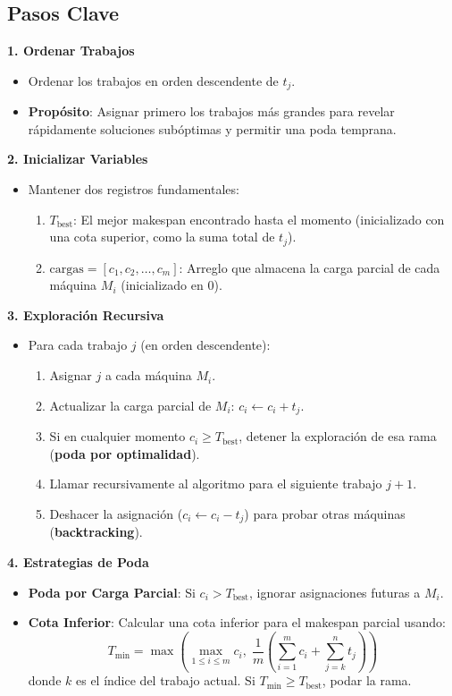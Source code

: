 \documentclass{report}
\begin{document}
		\subsection*{Pasos Clave}

		\textbf{1. Ordenar Trabajos}
		\begin{itemize}
			\item Ordenar los trabajos en orden descendente de \( t_j \). 
			\item \textbf{Propósito}: Asignar primero los trabajos más grandes para revelar rápidamente soluciones subóptimas y permitir una poda temprana.
		\end{itemize}

		\textbf{2. Inicializar Variables}
		\begin{itemize}
			\item Mantener dos registros fundamentales:
			\begin{enumerate}
				\item \( T_{\text{best}} \): El mejor makespan encontrado hasta el momento (inicializado con una cota superior, como la suma total de \( t_j \)).
				\item \( \text{cargas} = [c_1, c_2, \dots, c_m] \): Arreglo que almacena la carga parcial de cada máquina \( M_i \) (inicializado en 0).
			\end{enumerate}
		\end{itemize}

		\textbf{3. Exploración Recursiva}
		\begin{itemize}
			\item Para cada trabajo \( j \) (en orden descendente):
			\begin{enumerate}
				\item Asignar \( j \) a cada máquina \( M_i \).
				\item Actualizar la carga parcial de \( M_i \): \( c_i \leftarrow c_i + t_j \).
				\item Si en cualquier momento \( c_i \geq T_{\text{best}} \), detener la exploración de esa rama (\textbf{poda por optimalidad}).
				\item Llamar recursivamente al algoritmo para el siguiente trabajo \( j+1 \).
				\item Deshacer la asignación (\( c_i \leftarrow c_i - t_j \)) para probar otras máquinas (\textbf{backtracking}).
			\end{enumerate}
		\end{itemize}

		\textbf{4. Estrategias de Poda}
		\begin{itemize}
			\item \textbf{Poda por Carga Parcial}: Si \( c_i > T_{\text{best}} \), ignorar asignaciones futuras a \( M_i \).
			\item \textbf{Cota Inferior}: Calcular una cota inferior para el makespan parcial usando:
			\[
			T_{\text{min}} = \max\left( \max_{1 \leq i \leq m} c_i,\; \frac{1}{m} \left( \sum_{i=1}^m c_i + \sum_{j=k}^n t_j \right) \right)
			\]
			donde \( k \) es el índice del trabajo actual. Si \( T_{\text{min}} \geq T_{\text{best}} \), podar la rama.
		\end{itemize}
\end{document}
